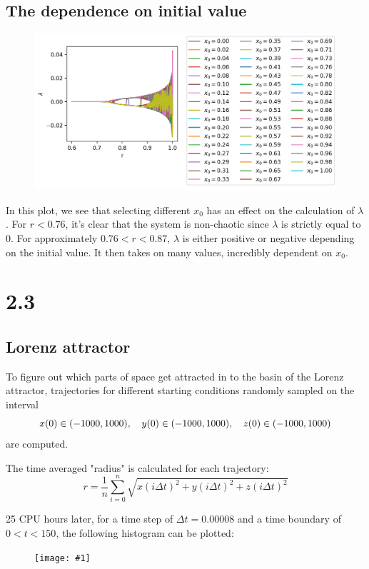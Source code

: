 \documentclass[11pt]{article}
\newcommand{\singlefigure}[1]{
\begin{figure}[H]
  \centering
  \begin{minipage}{0.4\textwidth}
    \centering
    \texttt{[image: \#1]}
  \end{minipage}
\end{figure}
}
\begin{document}
\subsection*{The dependence on initial value}
\begin{figure}[H]
  \centering
  \begin{minipage}{0.8\textwidth}
    \centering
    \includegraphics[width=\textwidth]{./plots/2_2/dependence.png}
  \end{minipage}
\end{figure}
In this plot, we see that selecting different $x_0$ has an effect on the calculation of $\lambda$.
For $r < 0.76$, it's clear that the system is non-chaotic since $\lambda$ is strictly equal to 0.
For approximately $0.76 < r < 0.87$, $\lambda$ is either positive or negative depending on the initial value.
It then takes on many values, incredibly dependent on $x_0$.

\section*{2.3}

\subsection*{Lorenz attractor}
To figure out which parts of space get attracted in to the basin of the Lorenz attractor, trajectories for different starting conditions randomly sampled on the interval
$$
x(0) \in (-1000, 1000), \quad
y(0) \in (-1000, 1000), \quad
z(0) \in (-1000, 1000) \\
$$
are computed. 

The time averaged "radius" is calculated for each trajectory:
$$
r = \frac{1}{n} \sum_{i=0}^n{\sqrt{x{(i \Delta t)}^2 + y{(i \Delta t)}^2 + z{(i \Delta t)}^2}}
$$

25 CPU hours later, for a time step of $\Delta t = 0.00008$ and a time boundary of $0 < t < 150$, the following histogram can be plotted:
\singlefigure{./plots/2_3/histo.png}
\end{document}
